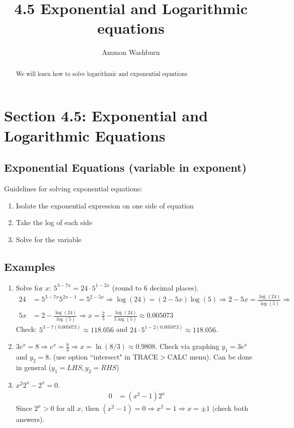 \documentclass{tufte-handout}
\title{4.5 Exponential and Logarithmic equations}
\author[AW]{Ammon Washburn}
\begin{document}
\maketitle

\begin{abstract}
We will learn how to solve logarithmic and exponential equations
\end{abstract}

\section{Section 4.5: Exponential and Logarithmic Equations}

\subsection{Exponential Equations (variable in exponent)}
Guidelines for solving exponential equations:
\begin{enumerate}
\item Isolate the exponential expression on one side of equation
\item Take the log of each side
\item Solve for the variable
\end{enumerate}

\subsection{Examples}
\begin{enumerate}
\item Solve for $x$: $5^{3 - 7x} = 24\cdot 5^{1-2x}$ (round to 6 decimal places).
\begin{align*}
24 &= 5^{3-7x}5^{2x-1} = 5^{2-5x} \Rightarrow 
\log(24) = (2-5x)\log(5) \Rightarrow
2-5x = \frac{\log(24)}{\log(5)} \Rightarrow \\
5x &= 2 - \frac{\log(24)}{\log(5)} \Rightarrow 
x = \frac{2}{5} - \frac{\log(24)}{5\log(5)} 
\approx 0.005073
\end{align*}
Check: $5^{3 - 7(0.005073)} \approx 118.056$ and $24\cdot 5^{1-2(0.005073)} \approx 118.056$.

\item $3e^x = 8 \Rightarrow e^x = \frac{8}{3} \Rightarrow x = \ln(8/3) \approx 0.9808$.
Check via graphing $y_1 = 3e^x$ and $y_2 = 8$. (use option ``intersect" in TRACE$>$CALC menu). Can be done in general ($y_1 = LHS, y_2 = RHS$)

\item $x^2 2^x - 2^x = 0$.
\begin{align*}
0 &= (x^2 - 1)2^x
\end{align*}
Since $2^x > 0$ for all $x$, then $(x^2 - 1) = 0 \Rightarrow x^2 = 1 \Rightarrow x = \pm 1$ (check both answers).
\end{enumerate}
\end{document}
